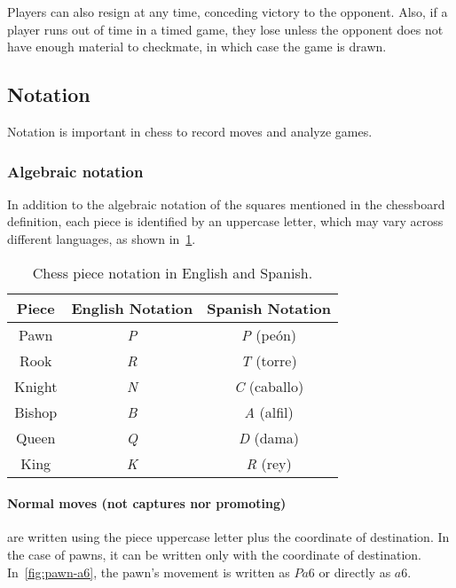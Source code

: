 \noindent Players can also resign at any time, conceding victory to the opponent. Also, if a player runs out of time in a timed game, they lose unless the opponent does not have enough material to checkmate, in which case the game is drawn.

\subsection*{Notation}

Notation is important in chess to record moves and analyze games.

\subsubsection*{Algebraic notation}

In addition to the algebraic notation of the squares mentioned in the chessboard definition, each piece is identified by an uppercase letter, which may vary across different languages, as shown in~\cref{tab:chess-notation}.

\begin{table}
    \centering
    \begin{tabular}{|c|c|c|}
        \hline
        Piece & English Notation & Spanish Notation \\ \hline
        Pawn           & \textit{P}               & \textit{P} (peón)         \\ \hline
        Rook           & \textit{R}               & \textit{T} (torre)        \\ \hline
        Knight         & \textit{N}               & \textit{C} (caballo)      \\ \hline
        Bishop         & \textit{B}               & \textit{A} (alfil)        \\ \hline
        Queen          & \textit{Q}               & \textit{D} (dama)         \\ \hline
        King           & \textit{K}               & \textit{R} (rey)          \\ \hline
    \end{tabular}
    \caption{Chess piece notation in English and Spanish.}\label{tab:chess-notation}
\end{table}

\paragraph{Normal moves (not captures nor promoting)}
are written using the piece uppercase letter plus the coordinate of destination. In the case of pawns, it can be written only with the coordinate of destination. In~\cref{fig:pawn-a6}, the pawn's movement is written as $Pa6$ or directly as $a6$.

